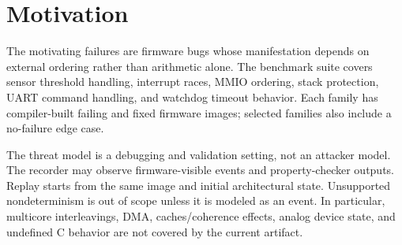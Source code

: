 \section{Motivation}

The motivating failures are firmware bugs whose manifestation depends on external ordering rather than arithmetic alone. The benchmark suite covers sensor threshold handling, interrupt races, MMIO ordering, stack protection, UART command handling, and watchdog timeout behavior. Each family has compiler-built failing and fixed firmware images; selected families also include a no-failure edge case.

The threat model is a debugging and validation setting, not an attacker model. The recorder may observe firmware-visible events and property-checker outputs. Replay starts from the same image and initial architectural state. Unsupported nondeterminism is out of scope unless it is modeled as an event. In particular, multicore interleavings, DMA, caches/coherence effects, analog device state, and undefined C behavior are not covered by the current artifact.
